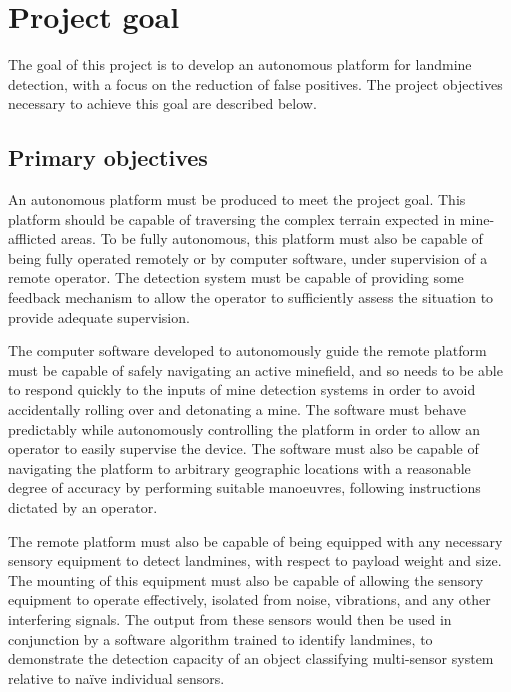 \documentclass[main.tex]{subfiles}
\begin{document}
% 
% 
%

\section{Project goal}

The goal of this project is to develop an autonomous platform for landmine detection, with a focus on the reduction of false positives. The project objectives necessary to achieve this goal are described below.
 
\subsection{Primary objectives}
An autonomous platform must be produced to meet the project goal. 
This platform should be capable of traversing the complex terrain expected in mine-afflicted areas. 
To be fully autonomous, this platform must also be capable of being fully operated remotely or by computer software, under supervision of a remote operator. 
The detection system must be capable of providing some feedback mechanism to allow the operator to sufficiently assess the situation to provide adequate supervision.

The computer software developed to autonomously guide the remote platform must be capable of safely navigating an active minefield, and so needs to be able to respond quickly to the inputs of mine detection systems in order to avoid accidentally rolling over and detonating a mine. 
The software must behave predictably while autonomously controlling the platform in order to allow an operator to easily supervise the device. 
The software must also be capable of navigating the platform to arbitrary geographic locations with a reasonable degree of accuracy by performing suitable manoeuvres, following instructions dictated by an operator.

The remote platform must also be capable of being equipped with any necessary sensory equipment to detect landmines, with respect to payload weight and size. 
The mounting of this equipment must also be capable of allowing the sensory equipment to operate effectively, isolated from noise, vibrations, and any other interfering signals. 
The output from these sensors would then be used in conjunction by a software algorithm trained to identify landmines, to demonstrate the detection capacity of an object classifying multi-sensor system relative to naïve individual sensors.
\end{document}
